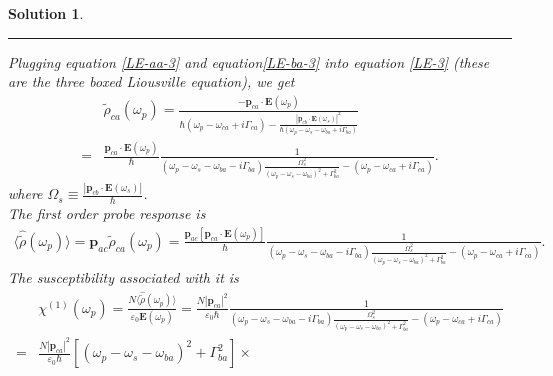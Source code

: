 \documentclass[UTF8,10pt,a4paper]{article}
\theoremstyle{Problem}
\theoremstyle{Solution}
\newtheorem*{sol}{Solution}
\providecommand{\abs}[1]{\left\lvert#1\right\rvert}
\begin{document}
\begin{sol}
\begin{enumerate}
        \rule{\columnwidth}{1pt}
        Plugging equation \eqref{LE-aa-3} and equation\eqref{LE-ba-3} into equation \eqref{LE-3} (these are the three boxed Liousville equation), we get
        \begin{align}
            \nonumber&\tilde{\rho}_{ca}(\omega_p)=\frac{-\bm{p}_{ca}\cdot\bm{E}(\omega_p)}{\hbar(\omega_p-\omega_{ca}+i\Gamma_{ca})-\frac{\abs{\bm{p}_{cb}\cdot\bm{E}(\omega_s)}^2}{\hbar(\omega_p-\omega_s-\omega_{ba}+i\Gamma_{ba})}}\\
            =&\frac{\bm{p}_{ca}\cdot\bm{E}(\omega_p)}{\hbar}\frac{1}{(\omega_p-\omega_s-\omega_{ba}-i\Gamma_{ba})\frac{\Omega_s^2}{(\omega_p-\omega_s-\omega_{ba})^2+\Gamma_{ba}^2}-(\omega_p-\omega_{ca}+i\Gamma_{ca})}.
        \end{align}
        where $\Omega_s\equiv\frac{\abs{\bm{p}_{cb}\cdot\bm{E}(\omega_s)}}{\hbar}$.\\
        The first order probe response is
        \begin{align}
            \langle\hat{\tilde{\rho}}(\omega_p)\rangle=\bm{p}_{ac}\tilde{\rho}_{ca}(\omega_p)=\frac{\bm{p}_{ac}[\bm{p}_{ca}\cdot\bm{E}(\omega_p)]}{\hbar}\frac{1}{(\omega_p-\omega_s-\omega_{ba}-i\Gamma_{ba})\frac{\Omega_s^2}{(\omega_p-\omega_s-\omega_{ba})^2+\Gamma_{ba}^2}-(\omega_p-\omega_{ca}+i\Gamma_{ca})}.
        \end{align}
        The susceptibility associated with it is
        \begin{align}
            \nonumber&\chi^{(1)}(\omega_p)=\frac{N\langle\hat{\tilde{\rho}}(\omega_p)\rangle}{\varepsilon_0\bm{E}(\omega_p)}=\frac{N\abs{\bm{p}_{ca}}^2}{\varepsilon_0\hbar}\frac{1}{(\omega_p-\omega_s-\omega_{ba}-i\Gamma_{ba})\frac{\Omega_s^2}{(\omega_p-\omega_s-\omega_{ba})^2+\Gamma_{ba}^2}-(\omega_p-\omega_{ca}+i\Gamma_{ca})}\\
            \nonumber=&\frac{N\abs{\bm{p}_{ca}}^2}{\varepsilon_0\hbar}[(\omega_p-\omega_s-\omega_{ba})^2+\Gamma_{ba}^2]\times\\

\end{align}
\end{enumerate}
\end{sol}
\end{document}
